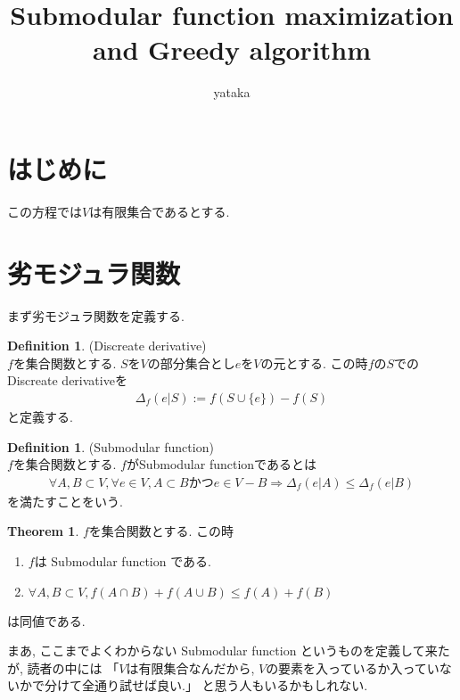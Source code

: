 \documentclass[11pt, a4paper, dvipdfmx]{jsarticle}
\title{Submodular function maximization and Greedy algorithm}
\author{yataka}
\theoremstyle{definition}
\newtheorem{Definition+}[Axiom+]{Definition}
\newtheorem{Theorem+}[Axiom+]{Theorem}
\begin{document}
\maketitle
\section{はじめに}
この方程では$V$は有限集合であるとする.
\section{劣モジュラ関数}
まず劣モジュラ関数を定義する.
\begin{Definition+}(Discreate derivative)\\
    $f$を集合関数とする. $S$を$V$の部分集合とし$e$を$V$の元とする. この時$f$の$S$での
    Discreate derivativeを
    \begin{align*}
        \Delta_{f}(e | S) := f(S\cup\{e\}) - f(S)
    \end{align*}
    と定義する.
\end{Definition+}
\begin{Definition+}(Submodular function)\\
    $f$を集合関数とする. $f$がSubmodular functionであるとは
    \begin{align*}
        \forall A, B\subset V, \forall e\in V,A\subset B かつe\in V - B\Longrightarrow \Delta_{f}(e | A)\leq\Delta_{f}(e | B)
    \end{align*}
    を満たすことをいう.
\end{Definition+}
\begin{Theorem+}$f$を集合関数とする. この時
    \begin{enumerate}
        \item $f$は Submodular function である.
        \item $\forall A, B\subset V, f(A\cap B) + f(A\cup B)\leq f(A) + f(B)$ 
    \end{enumerate}
    は同値である.
\end{Theorem+}
まあ, ここまでよくわからない Submodular function というものを定義して来たが, 読者の中には
「$V$は有限集合なんだから, $V$の要素を入っているか入っていないかで分けて全通り試せば良い.」 と思う人もいるかもしれない.
\end{document}
